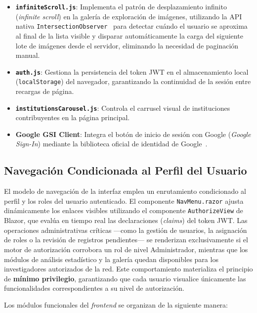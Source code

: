 \begin{itemize}
    \item \textbf{\texttt{infiniteScroll.js}}: Implementa el patrón de desplazamiento infinito 
    (\textit{infinite scroll}) en la galería de exploración de imágenes, utilizando la API nativa 
    \texttt{IntersectionObserver}~\cite{mdn_intersection_observer} para detectar cuándo el usuario 
    se aproxima al final de la lista visible y disparar automáticamente la carga del siguiente lote 
    de imágenes desde el servidor, eliminando la necesidad de paginación manual.
    \item \textbf{\texttt{auth.js}}: Gestiona la persistencia del token JWT en el almacenamiento local 
    (\texttt{localStorage}) del navegador, garantizando la continuidad de la sesión entre recargas de página.
    \item \textbf{\texttt{institutionsCarousel.js}}: Controla el carrusel visual de instituciones 
    contribuyentes en la página principal.
    \item \textbf{Google GSI Client}: Integra el botón de inicio de sesión con Google 
    (\textit{Google Sign-In}) mediante la biblioteca oficial de identidad de 
    Google~\cite{google_identity_docs}.
\end{itemize}

\subsection{Navegación Condicionada al Perfil del Usuario}
El modelo de navegación de la interfaz emplea un enrutamiento condicionado al perfil y los roles del usuario 
autenticado. El componente \texttt{NavMenu.razor} ajusta dinámicamente los enlaces visibles utilizando el 
componente \texttt{AuthorizeView} de Blazor, que evalúa en tiempo real las declaraciones (\textit{claims}) 
del token JWT. Las operaciones administrativas críticas ---como la gestión de usuarios, la asignación de 
roles o la revisión de registros pendientes--- se renderizan exclusivamente si el motor de autorización 
corrobora un rol de nivel Administrador, mientras que los módulos de análisis estadístico y la galería 
quedan disponibles para los investigadores autorizados de la red. Este comportamiento materializa el 
principio de \textbf{mínimo privilegio}, garantizando que cada usuario visualice únicamente las 
funcionalidades correspondientes a su nivel de autorización.

Los módulos funcionales del \textit{frontend} se organizan de la siguiente manera:

